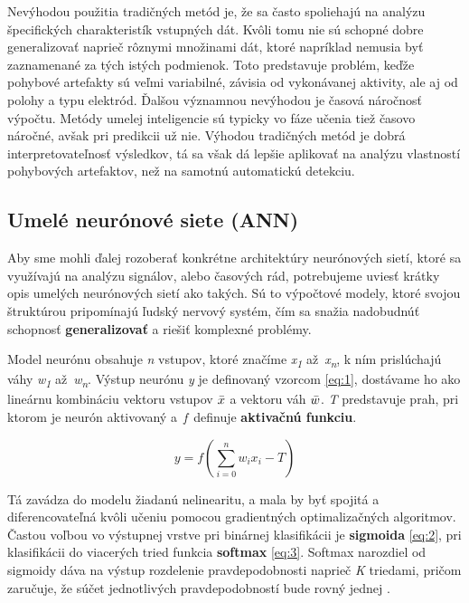 Nevýhodou použitia tradičných metód je, že sa často spoliehajú na analýzu špecifických charakteristík vstupných dát. Kvôli tomu nie sú schopné dobre generalizovať naprieč rôznymi množinami dát, ktoré napríklad nemusia byť zaznamenané za tých istých podmienok. Toto predstavuje problém, keďže pohybové artefakty sú veľmi variabilné, závisia od vykonávanej aktivity, ale aj od polohy a typu elektród. Ďalšou významnou nevýhodou je časová náročnosť výpočtu. Metódy umelej inteligencie sú typicky vo fáze učenia tiež časovo náročné, avšak pri predikcii už nie. Výhodou tradičných metód je dobrá interpretovateľnosť výsledkov, tá sa však dá lepšie aplikovať na analýzu vlastností pohybových artefaktov, než na samotnú automatickú detekciu.

\newpage

\subsection{Umelé neurónové siete (ANN)}

Aby sme mohli ďalej rozoberať konkrétne architektúry neurónových sietí, ktoré sa využívajú na analýzu signálov, alebo časových rád, potrebujeme uviesť krátky opis umelých neurónových sietí ako takých. Sú to výpočtové modely, ktoré svojou štruktúrou pripomínajú ľudský nervový systém, čím sa snažia nadobudnúť schopnosť \textbf{generalizovať} a riešiť komplexné problémy. 

Model neurónu obsahuje \textit{n} vstupov, ktoré značíme \textit{x\textsubscript{1}} až~\textit{x\textsubscript{n}}, k ním prislúchajú váhy \textit{w\textsubscript{1}} až~\textit{w\textsubscript{n}}. Výstup neurónu \textit{y} je definovaný vzorcom \ref{eq:1}, dostávame ho ako lineárnu kombináciu vektoru vstupov \textit{\( \Bar{x} \)} a vektoru váh \textit{\( \Bar{w} \)}. \textit{T} predstavuje prah, pri ktorom je neurón aktivovaný a~\textit{f}~definuje \textbf{aktivačnú funkciu}. 

\begin{equation} 
    \label{eq:1}
    y = f(\sum_{i=0}^{n} w_i x_i - T)
\end{equation}

Tá zavádza do modelu žiadanú nelinearitu, a mala by byť spojitá a diferencovateľná kvôli učeniu pomocou gradientných optimalizačných algoritmov. Častou voľbou vo výstupnej vrstve pri binárnej klasifikácii je \textbf{sigmoida} \ref{eq:2}, pri klasifikácii do viacerých tried funkcia \textbf{softmax} \ref{eq:3}. Softmax narozdiel od sigmoidy dáva na výstup rozdelenie pravdepodobnosti naprieč \textit{K} triedami, pričom zaručuje, že súčet jednotlivých pravdepodobností bude rovný jednej \cite{Zou2008}\cite{yegnanarayana2009artificial}\cite{mehrotra1997elements}.

